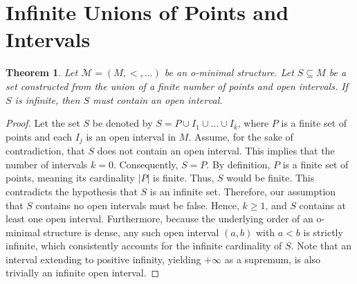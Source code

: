 \documentclass[12pt]{article}
\newtheorem{theorem}{Theorem}
\begin{document}
\section{Infinite Unions of Points and Intervals}
\begin{theorem}
Let $\mathcal{M} = (M, <, \dots)$ be an o-minimal structure.
Let $S \subseteq M$ be a set constructed from the union of a finite number of points and open intervals.
If $S$ is infinite, then $S$ must contain an open interval.
\end{theorem}
\begin{proof}
Let the set $S$ be denoted by $S = P \cup I_1 \cup \dots \cup I_k$, where $P$ is a finite set of points and each $I_j$ is an open interval in $M$.
Assume, for the sake of contradiction, that $S$ does not contain an open interval.
This implies that the number of intervals $k = 0$. Consequently, $S = P$.
By definition, $P$ is a finite set of points, meaning its cardinality $|P|$ is finite. Thus, $S$ would be finite.
This contradicts the hypothesis that $S$ is an infinite set.
Therefore, our assumption that $S$ contains no open intervals must be false.
Hence, $k \ge 1$, and $S$ contains at least one open interval.
Furthermore, because the underlying order of an o-minimal structure is dense, any such open interval $(a, b)$ with $a < b$ is strictly infinite, which consistently accounts for the infinite cardinality of $S$. 
Note that an interval extending to positive infinity, yielding $+\infty$ as a supremum, is also trivially an infinite open interval.
\end{proof}
\end{document}
